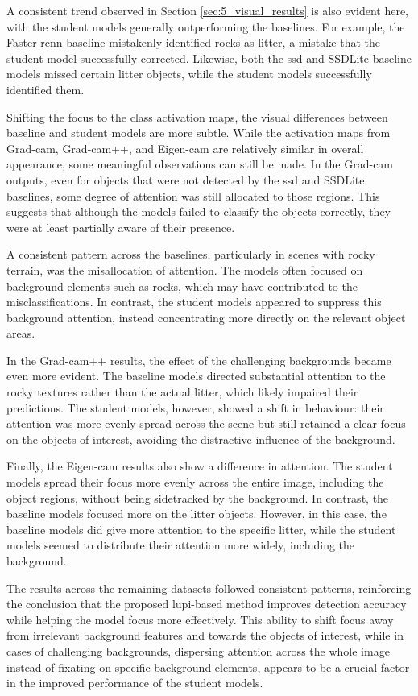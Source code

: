 A consistent trend observed in Section \ref{sec:5_visual_results} is also evident here, with the student models generally outperforming the baselines. For example, the Faster \gls{rcnn} baseline mistakenly identified rocks as litter, a mistake that the student model successfully corrected. Likewise, both the \gls{ssd} and SSDLite baseline models missed certain litter objects, while the student models successfully identified them.

Shifting the focus to the class activation maps, the visual differences between baseline and student models are more subtle. While the activation maps from Grad-\gls{cam}, Grad-\gls{cam}++, and Eigen-\gls{cam} are relatively similar in overall appearance, some meaningful observations can still be made. In the Grad-\gls{cam} outputs, even for objects that were not detected by the \gls{ssd} and SSDLite baselines, some degree of attention was still allocated to those regions. This suggests that although the models failed to classify the objects correctly, they were at least partially aware of their presence.

A consistent pattern across the baselines, particularly in scenes with rocky terrain, was the misallocation of attention. The models often focused on background elements such as rocks, which may have contributed to the misclassifications. In contrast, the student models appeared to suppress this background attention, instead concentrating more directly on the relevant object areas.

In the Grad-\gls{cam}++ results, the effect of the challenging backgrounds became even more evident. The baseline models directed substantial attention to the rocky textures rather than the actual litter, which likely impaired their predictions. The student models, however, showed a shift in behaviour: their attention was more evenly spread across the scene but still retained a clear focus on the objects of interest, avoiding the distractive influence of the background.

Finally, the Eigen-\gls{cam} results also show a difference in attention. The student models spread their focus more evenly across the entire image, including the object regions, without being sidetracked by the background. In contrast, the baseline models focused more on the litter objects. However, in this case, the baseline models did give more attention to the specific litter, while the student models seemed to distribute their attention more widely, including the background.

The results across the remaining datasets followed consistent patterns, reinforcing the conclusion that the proposed \gls{lupi}-based method improves detection accuracy while helping the model focus more effectively. This ability to shift focus away from irrelevant background features and towards the objects of interest, while in cases of challenging backgrounds, dispersing attention across the whole image instead of fixating on specific background elements, appears to be a crucial factor in the improved performance of the student models.


